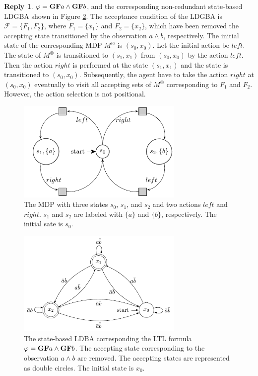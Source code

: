 \documentclass[10 pt, dvipdfmx]{article}
\theoremstyle{definition}
\newtheorem{review point}{Review Point}[section]
\newtheorem*{reply}{Reply}
\begin{document}
\begin{reply}
  $\varphi = \text{{\bf GF}}a \land \text{{\bf GF}}b$, and the corresponding non-redundant state-based LDGBA shown in Figure \ref{LDBA_counterexample}. The acceptance condition of the LDGBA is $\mathcal{F} = \{ F_1, F_2 \}$, where $F_1 = \{ x_1 \}$ and $F_2 = \{ x_2 \}$, which have been removed the accepting state transitioned by the observation $a\land b$, respectively. The initial state of the corresponding MDP $M^{\otimes}$ is $(s_0,x_0)$. Let the initial action be $left$. The state of $M^{\otimes}$ is transitioned to $(s_1,x_1)$ from $(s_0,x_0)$ by the action $left$. Then the action $right$ is performed at the state $(s_1,x_1)$ and the state is transitioned to $(s_0,x_0)$. Subsequently, the agent have to take the action $right$ at $(s_0,x_0)$ eventually to visit all accepting sets of $M^{\otimes}$ corresponding to $F_1$ and $F_2$. However, the action selection is not positional.

  \begin{figure}[H]
      \centering
      \includegraphics[width = 8cm]{reply_letter_MDP.pdf}
      \caption{The MDP with three states $s_0$, $s_1$, and $s_2$ and two actions $left$ and $right$. $s_1$ and $s_2$ are labeled with $\{ a \}$ and $\{ b \}$, respectively. The initial sate is $s_0$.}
      \label{MDP_counterexample}
  \end{figure}

  \begin{figure}[H]
     \centering
     \vspace{2mm}
     \includegraphics[width = 8cm]{reply_letter_LDBA.pdf}
     \caption{The state-based LDBA corresponding the LTL formula $\varphi = \text{{\bf GF}}a \land \text{{\bf GF}}b$. The accepting state corresponding to the observation $a \land b$ are removed. The accepting states are represented as double circles. The initial state is $x_0$.}
     \label{LDBA_counterexample}
  \end{figure}


\end{reply}
\end{document}
